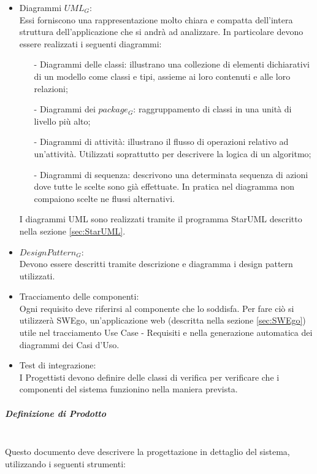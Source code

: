 				\begin{itemize}
					\item Diagrammi $UML_G$:\\
					Essi forniscono una rappresentazione molto chiara e compatta dell'intera struttura dell'applicazione che si andrà ad analizzare. In particolare devono essere realizzati i seguenti diagrammi:
					\begin{itemize}
						\item[-] Diagrammi delle classi: illustrano una collezione di elementi dichiarativi di un modello come classi e tipi, assieme ai loro contenuti e alle loro relazioni;
						\item[-] Diagrammi dei $package_G$:  raggruppamento di classi in una unità di livello più alto;
						\item[-] Diagrammi di attività: illustrano il flusso di operazioni relativo ad un'attività. Utilizzati soprattutto per descrivere la logica di un algoritmo;
						\item[-] Diagrammi di sequenza: descrivono una determinata sequenza di azioni dove tutte le scelte sono già effettuate. In pratica nel diagramma non compaiono scelte ne flussi alternativi.
					\end{itemize}
				I diagrammi UML sono realizzati tramite il programma StarUML descritto nella sezione \ref{sec:StarUML}.
					\item $Design Pattern_G$:\\
					Devono essere descritti tramite descrizione e diagramma i design pattern utilizzati.
					\item Tracciamento delle componenti:\\
					Ogni requisito deve riferirsi al componente che lo soddisfa. Per fare ciò si utilizzerà SWEgo, un'applicazione web (descritta nella sezione \ref{sec:SWEgo}) utile nel tracciamento Use Case - Requisiti e nella generazione automatica dei diagrammi dei Casi d'Uso.
					\item Test di integrazione:\\ 
					I Progettisti devono definire delle classi di verifica per verificare che i componenti del sistema funzionino nella maniera prevista.	
				\end{itemize}
			\subparagraph{Definizione di Prodotto}
			\mbox{}\\
			Questo documento deve descrivere la progettazione in dettaglio del sistema, utilizzando i seguenti strumenti:
